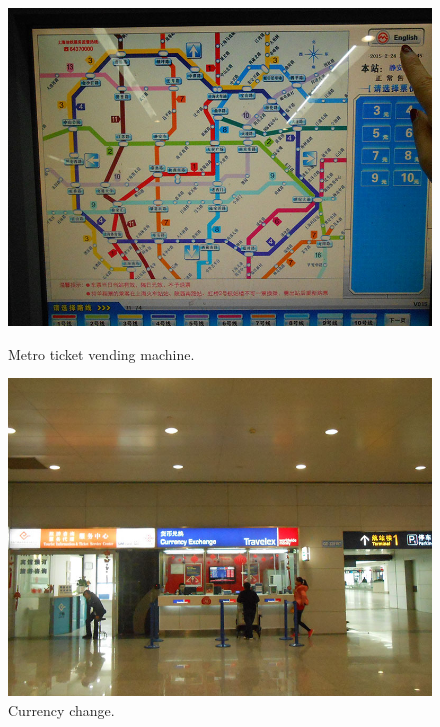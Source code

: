 \documentclass[11pt]{article}
\begin{document}
\begin{figure}[!h]
	\begin{minipage}[t]{.5\textwidth}
     	\centering
        	\includegraphics{image022.jpg}
		\caption{Metro ticket vending machine.\label{pic8}}
	\end{minipage}%
     \begin{minipage}[t]{.5\textwidth}
         \centering
         \includegraphics{image026.jpg}
		\caption{Currency change. \label{pic9}}
    \end{minipage}%
 \end{figure}
 
\end{document}
